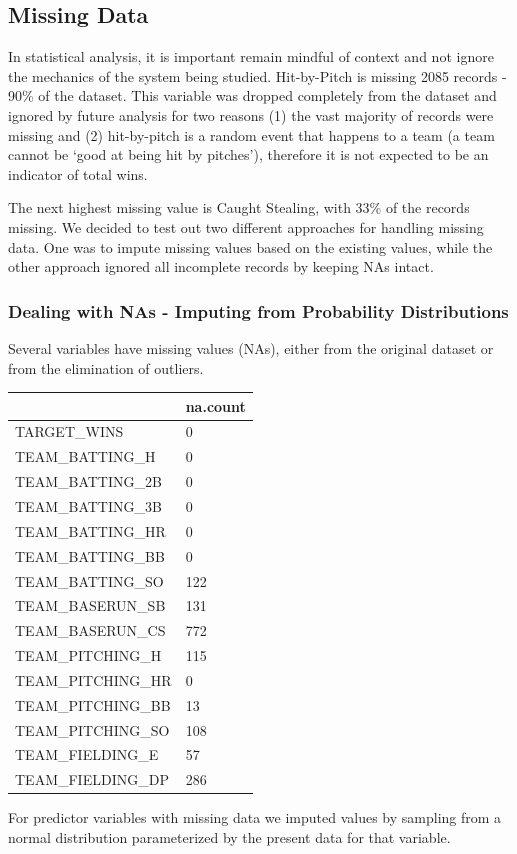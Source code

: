 \documentclass[]{article}
\begin{document}
\subsection{Missing Data}\label{missing-data}

In statistical analysis, it is important remain mindful of context and
not ignore the mechanics of the system being studied. Hit-by-Pitch is
missing 2085 records - 90\% of the dataset. This variable was dropped
completely from the dataset and ignored by future analysis for two
reasons (1) the vast majority of records were missing and (2)
hit-by-pitch is a random event that happens to a team (a team cannot be
`good at being hit by pitches'), therefore it is not expected to be an
indicator of total wins.

The next highest missing value is Caught Stealing, with 33\% of the
records missing. We decided to test out two different approaches for
handling missing data. One was to impute missing values based on the
existing values, while the other approach ignored all incomplete records
by keeping NAs intact.

\subsubsection{Dealing with NAs - Imputing from Probability
Distributions}\label{dealing-with-nas---imputing-from-probability-distributions}

Several variables have missing values (NAs), either from the original
dataset or from the elimination of outliers.

\begin{longtable}[c]{@{}ll@{}}
\toprule
& na.count\tabularnewline
\midrule
\endhead
TARGET\_WINS & 0\tabularnewline
TEAM\_BATTING\_H & 0\tabularnewline
TEAM\_BATTING\_2B & 0\tabularnewline
TEAM\_BATTING\_3B & 0\tabularnewline
TEAM\_BATTING\_HR & 0\tabularnewline
TEAM\_BATTING\_BB & 0\tabularnewline
TEAM\_BATTING\_SO & 122\tabularnewline
TEAM\_BASERUN\_SB & 131\tabularnewline
TEAM\_BASERUN\_CS & 772\tabularnewline
TEAM\_PITCHING\_H & 115\tabularnewline
TEAM\_PITCHING\_HR & 0\tabularnewline
TEAM\_PITCHING\_BB & 13\tabularnewline
TEAM\_PITCHING\_SO & 108\tabularnewline
TEAM\_FIELDING\_E & 57\tabularnewline
TEAM\_FIELDING\_DP & 286\tabularnewline
\bottomrule
\end{longtable}

For predictor variables with missing data we imputed values by sampling
from a normal distribution parameterized by the present data for that
variable.
\end{document}
